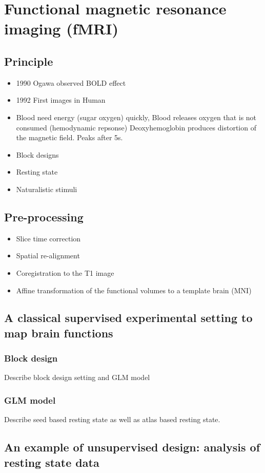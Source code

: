 \section{Functional magnetic resonance imaging (fMRI)}
\subsection{Principle}
\begin{itemize}
\item 1990 Ogawa observed BOLD effect
\item 1992 First images in Human
  \item Blood need energy (sugar oxygen) quickly, Blood releases oxygen that is
    not consumed (hemodynamic repsonse) Deoxyhemoglobin produces distortion of
    the magnetic field. Peaks after 5s.
  \item Block designs
  \item Resting state
    \item Naturalistic stimuli
\end{itemize}
\subsection{Pre-processing}
\begin{itemize}
\item Slice time correction
\item Spatial re-alignment
\item Coregistration to the T1 image
\item Affine transformation of the functional volumes to a template brain (MNI)
\end{itemize}
\subsection{A classical supervised experimental setting to map brain functions}
\subsubsection{Block design}
Describe block design setting and GLM model
\subsubsection{GLM model}
Describe seed based resting state as well as atlas based resting state.
\subsection{An example of unsupervised design: analysis of resting state data}

